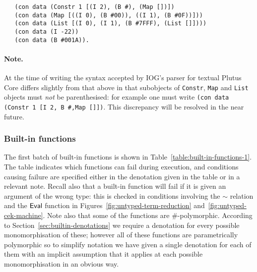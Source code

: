 \begin{verbatim}
   (con data (Constr 1 [(I 2), (B #), (Map [])])
   (con data (Map [((I 0), (B #00)), ((I 1), (B #0F))]))
   (con data (List [(I 0), (I 1), (B #7FFF), (List []])))
   (con data (I -22))
   (con data (B #001A)).
\end{verbatim}

\paragraph{Note.}  At the time of writing the syntax accepted by IOG's parser for textual Plutus Core
differs slightly from that above in that subobjects
of \texttt{Constr}, \texttt{Map} and \texttt{List} objects must \textit{not} be
parenthesised: for example one must write \verb|(con data (Constr 1 [I 2, B #,Map []])|.
This discrepancy will be resolved in the near future.


\subsubsection{Built-in functions}
\label{sec:built-in-functions-1}
The first batch of built-in functions is shown in
Table~\ref{table:built-in-functions-1}.  The table indicates which functions can
fail during execution, and conditions causing failure are specified either in
the denotation given in the table or in a relevant note.  Recall also that a
built-in function will fail if it is given an argument of the wrong type: this
is checked in conditions involving the $\sim$ relation and the $\mathsf{Eval}$ function
in Figures~\ref{fig:untyped-term-reduction} and~\ref{fig:untyped-cek-machine}.
Note also that some of the functions are
\#-polymorphic.  According to Section~\ref{sec:builtin-denotations} we
require a denotation for every possible monomorphisation of these; however all
of these functions are parametrically polymorphic so to simplify notation we
have given a single denotation for each of them with an implicit assumption that
it applies at each possible monomorphisation in an obvious way.

